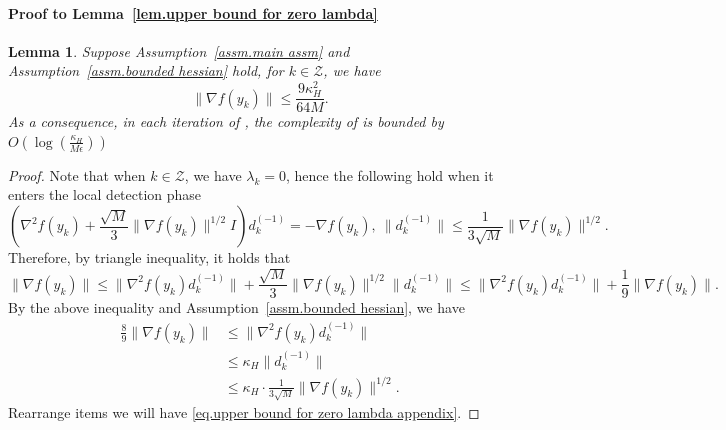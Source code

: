 \documentclass{article}
\theoremstyle{plain}
\newtheorem{lemma}[theorem]{Lemma}
\theoremstyle{definition}
\theoremstyle{remark}
\begin{document}
\paragraph{Proof to Lemma~\ref{lem.upper bound for zero lambda}}
\begin{lemma}
    \label{lem.upper bound for zero lambda appendix}
    Suppose Assumption~\ref{assm.main assm} and Assumption~\ref{assm.bounded hessian} hold, for $k\in \mathcal{Z}$, we have
    \begin{equation}
        \label{eq.upper bound for zero lambda appendix}
        \|\nabla f(y_k)\|\leq \frac{9\kappa_H^2}{64M}.
    \end{equation}
    As a consequence, in each iteration of , the complexity of  is bounded by $O\left(\log\left(\frac{\kappa_H}{M\epsilon}\right)\right)$
\end{lemma}
\begin{proof}
    Note that when $k\in \mathcal{Z}$, we have $\lambda_k =0$, hence the following hold when it enters the local detection phase
    \begin{equation*}
        \left (\nabla^2 f(y_k)+\frac{\sqrt{M}}{3}\|\nabla f(y_k)\|^{1/2} I\right )d_k^{(-1)} = -\nabla f(y_k), \ \|d_k^{(-1)}\| \leq \frac{1}{3\sqrt{M}}\|\nabla f(y_k)\|^{1/2}.
    \end{equation*}
    Therefore, by triangle inequality, it holds that
    \begin{equation*}
        \|\nabla f(y_k)\| \leq \|\nabla^2 f(y_k) d_k^{(-1)}\| +\frac{\sqrt{M}}{3}\|\nabla f(y_k)\|^{1/2}\|d_k^{(-1)}\| \leq \|\nabla^2 f(y_k) d_k^{(-1)}\|+\frac{1}{9}\|\nabla f(y_k)\|.
    \end{equation*}
    By the above inequality and Assumption~\ref{assm.bounded hessian}, we have
    \begin{equation*}
        \begin{aligned}
            \frac{8}{9}\|\nabla f(y_k)\| & \leq \|\nabla^2 f(y_k) d_k^{(-1)}\|                              \\
                                         & \leq \kappa_H \|d_k^{(-1)}\|                                     \\
                                         & \leq \kappa_H \cdot \frac{1}{3\sqrt{M}}\|\nabla f(y_k)\|^{1/2} .
        \end{aligned}
    \end{equation*}
    Rearrange items we will have \eqref{eq.upper bound for zero lambda appendix}.
\end{proof}
\end{document}
